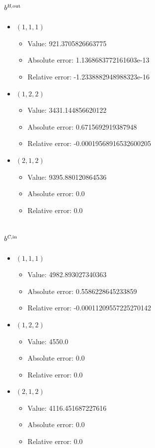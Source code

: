 \documentclass{article}%
\begin{document}
\subsection{$b^{\textsl{H},\text{out}}$}%
\begin{itemize}%
	\item $(1, 1, 1)$%
	\begin{itemize}%
		\item Value: 921.3705826663775%
		\item Absolute error: 1.1368683772161603e-13%
		\item Relative error: -1.2338882948988323e-16%
	\end{itemize}%
	\item $(1, 2, 2)$%
	\begin{itemize}%
		\item Value: 3431.144856620122%
		\item Absolute error: 0.6715692919387948%
		\item Relative error: -0.00019568916532600205%
	\end{itemize}%
	\item $(2, 1, 2)$%
	\begin{itemize}%
		\item Value: 9395.880120864536%
		\item Absolute error: 0.0%
		\item Relative error: 0.0%
	\end{itemize}%
\end{itemize}%
\subsection{$b^{\textsl{C},\text{in}}$}%
\begin{itemize}%
	\item $(1, 1, 1)$%
	\begin{itemize}%
		\item Value: 4982.893027340363%
		\item Absolute error: 0.5586228645233859%
		\item Relative error: -0.00011209557225270142%
	\end{itemize}%
	\item $(1, 2, 2)$%
	\begin{itemize}%
		\item Value: 4550.0%
		\item Absolute error: 0.0%
		\item Relative error: 0.0%
	\end{itemize}%
	\item $(2, 1, 2)$%
	\begin{itemize}%
		\item Value: 4116.451687227616%
		\item Absolute error: 0.0%
		\item Relative error: 0.0%
	\end{itemize}%
\end{itemize}%
\end{document}
